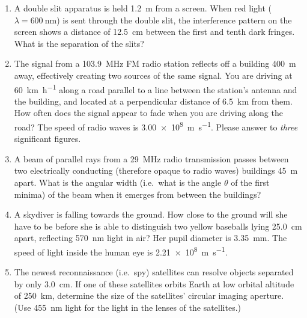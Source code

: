 \begin{multicols}{2}
\begin{enumerate}[itemsep=4pt,leftmargin=12pt]
  \item A double slit apparatus is held \SI{1.2}{\metre} from a screen. When red
    light ($\lambda=\SI{600}{\nano\metre}$) is sent through the double slit, the
    interference pattern on the screen shows a distance of
    \SI{12.5}{\centi\metre} between the first and tenth dark fringes. What is
    the separation of the slits?
  
  \item The signal from a \SI{103.9}{\mega\hertz} FM radio station reflects off
    a building \SI{400}{\metre} away, effectively creating two sources of the
    same signal. You are driving at \SI{60}{\kilo\metre\per\hour} along a road
    parallel to a line between the station's antenna and the building, and
    located at a perpendicular distance of \SI{6.5}{\kilo\metre} from them. How
    often does the signal appear to fade when you are driving along the road?
    The speed of radio waves is \SI{3.00e8}{\metre\per\second}. Please answer to
    \emph{three} significant figures.

  \item A beam of parallel rays from a \SI{29}{\mega\hertz} radio transmission
    passes between two electrically conducting (therefore opaque to radio waves)
    buildings \SI{45}{\metre} apart. What is the angular width (i.e.\ what is
    the angle $\theta$ of the first minima) of the beam when it emerges from
    between the buildings?
  
  \item A skydiver is falling towards the ground. How close to the ground will
    she have to be before she is able to distinguish two yellow baseballs lying
    \SI{25.0}{\centi\metre} apart, reflecting \SI{570}{\nano\metre} light in
    air? Her pupil diameter is \SI{3.35}{\milli\metre}. The speed of light
    inside the human eye is \SI{2.21e8}{\metre\per\second}.

  \item The newest reconnaissance (i.e.\ spy) satellites can resolve objects
    separated by only \SI{3.0}{\centi\metre}. If one of these satellites orbits
    Earth at low orbital altitude of \SI{250}{\kilo\metre}, determine the size
    of the satellites' circular imaging aperture. (Use \SI{455}{\nano\metre}
    light for the light in the lenses of the satellites.)
  \end{enumerate}
\end{multicols}

